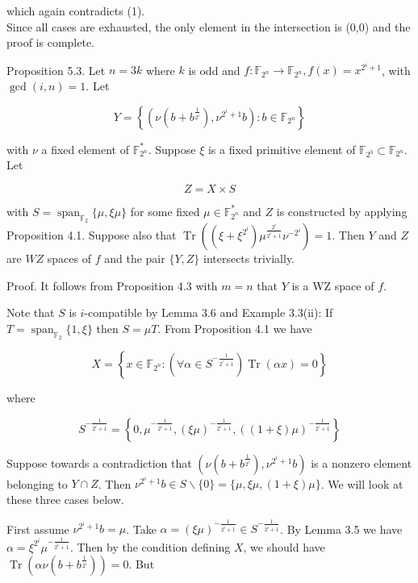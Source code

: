 \documentclass[10pt]{article}
\begin{document}
which again contradicts (1).\\
Since all cases are exhausted, the only element in the intersection is (0,0) and the proof is complete.

Proposition 5.3. Let $n=3 k$ where $k$ is odd and $f: \mathbb{F}_{2^{n}} \rightarrow \mathbb{F}_{2^{n}}, f(x)= x^{2^{i}+1}$, with $\operatorname{gcd}(i, n)=1$. Let

$$
Y=\left\{\left(\nu\left(b+b^{\frac{1}{2^{i}}}\right), \nu^{2^{i}+1} b\right): b \in \mathbb{F}_{2^{n}}\right\}
$$

with $\nu$ a fixed element of $\mathbb{F}_{2^{n}}^{*}$. Suppose $\xi$ is a fixed primitive element of $\mathbb{F}_{2^{3}} \subset \mathbb{F}_{2^{n}}$. Let

$$
Z=X \times S
$$

with $S=\operatorname{span}_{\mathbb{F}_{2}}\{\mu, \xi \mu\}$ for some fixed $\mu \in \mathbb{F}_{2^{n}}^{*}$ and $Z$ is constructed by applying Proposition 4.1. Suppose also that $\operatorname{Tr}\left(\left(\xi+\xi^{2^{i}}\right) \mu^{\frac{2^{i}}{2^{i}+1}} \nu^{-2^{i}}\right)=1$. Then $Y$ and $Z$ are $W Z$ spaces of $f$ and the pair $\{Y, Z\}$ intersects trivially.

Proof. It follows from Proposition 4.3 with $m=n$ that $Y$ is a WZ space of $f$.

Note that $S$ is $i$-compatible by Lemma 3.6 and Example 3.3(ii): If $T= \operatorname{span}_{\mathbb{F}_{2}}\{1, \xi\}$ then $S=\mu T$. From Proposition 4.1 we have

$$
X=\left\{x \in \mathbb{F}_{2^{n}}:\left(\forall \alpha \in S^{-\frac{1}{2^{i}+1}}\right) \operatorname{Tr}(\alpha x)=0\right\}
$$

where

$$
S^{-\frac{1}{2^{i}+1}}=\left\{0, \mu^{-\frac{1}{2^{i}+1}},(\xi \mu)^{-\frac{1}{2^{i}+1}},((1+\xi) \mu)^{-\frac{1}{2^{i}+1}}\right\}
$$

Suppose towards a contradiction that $\left(\nu\left(b+b^{\frac{1}{2^{i}}}\right), \nu^{2^{i}+1} b\right)$ is a nonzero element belonging to $Y \cap Z$. Then $\nu^{2^{i}+1} b \in S \backslash\{0\}=\{\mu, \xi \mu,(1+\xi) \mu\}$. We will look at these three cases below.

First assume $\nu^{2^{i}+1} b=\mu$. Take $\alpha=(\xi \mu)^{-\frac{1}{2^{i}+1}} \in S^{-\frac{1}{2^{i}+1}}$. By Lemma 3.5 we have $\alpha=\xi^{2^{i}} \mu^{-\frac{1}{2^{i}+1}}$. Then by the condition defining $X$, we should have $\operatorname{Tr}\left(\alpha \nu\left(b+b^{\frac{1}{2^{i}}}\right)\right)=0$. But
\end{document}
